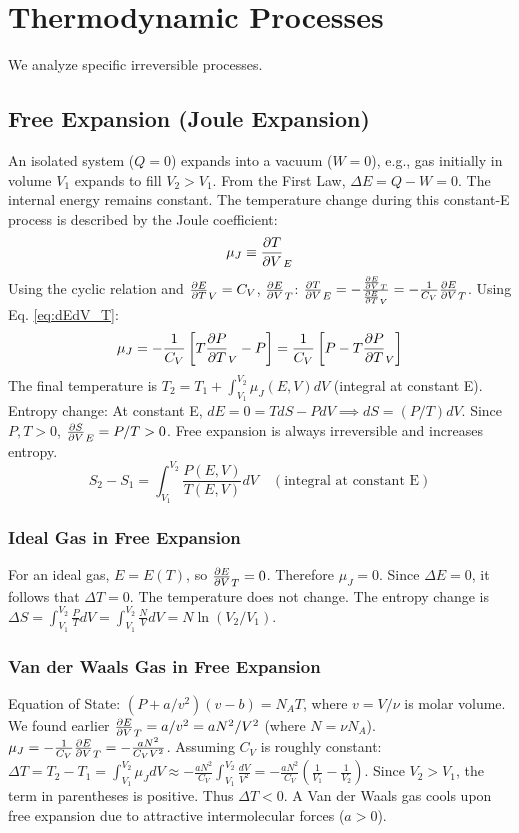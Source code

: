 \documentclass[10pt, letterpaper]{article}
\begin{document}
\section{Thermodynamic Processes}
We analyze specific irreversible processes.

\subsection{Free Expansion (Joule Expansion)}
An isolated system ($Q=0$) expands into a vacuum ($W=0$), e.g., gas initially in volume $V_1$ expands to fill $V_2 > V_1$.
From the First Law, $\Delta E = Q - W = 0$. The internal energy remains constant.
The temperature change during this constant-E process is described by the Joule coefficient:
\begin{equation*}
    \mu_J \equiv \pdv{T}{V}_{E}
\end{equation*}
Using the cyclic relation and $\pdv{E}{T}_V = C_V$, $\pdv{E}{V}_T$:
$\pdv{T}{V}_{E} = - \frac{\pdv{E}{V}_{T}}{\pdv{E}{T}_{V}} = -\frac{1}{C_V} \pdv{E}{V}_{T}$. Using Eq. \eqref{eq:dEdV_T}:
\begin{equation}
    \mu_J = -\frac{1}{C_V} \left[ T \pdv{P}{T}_{V} - P \right] = \frac{1}{C_V} \left[ P - T \pdv{P}{T}_{V} \right]
\end{equation}
The final temperature is $T_2 = T_1 + \int_{V_1}^{V_2} \mu_J(E, V) dV$ (integral at constant E).
Entropy change: At constant E, $dE=0=TdS-PdV \implies dS = (P/T) dV$.
Since $P, T > 0$, $\pdv{S}{V}_{E} = P/T > 0$. Free expansion is always irreversible and increases entropy.
\begin{equation}
    S_2 - S_1 = \int_{V_1}^{V_2} \frac{P(E, V)}{T(E, V)} dV \quad (\text{integral at constant E})
\end{equation}

\subsubsection*{Ideal Gas in Free Expansion}
For an ideal gas, $E=E(T)$, so $\pdv{E}{V}_T = 0$. Therefore $\mu_J = 0$.
Since $\Delta E = 0$, it follows that $\Delta T = 0$. The temperature does not change.
The entropy change is $\Delta S = \int_{V_1}^{V_2} \frac{P}{T} dV = \int_{V_1}^{V_2} \frac{N}{V} dV = N \ln(V_2/V_1)$.

\subsubsection*{Van der Waals Gas in Free Expansion}
Equation of State: $(P + a/v^2)(v-b) = N_A T$, where $v=V/\nu$ is molar volume.
We found earlier $\pdv{E}{V}_{T} = a/v^2 = a N^2 / V^2$ (where $N=\nu N_A$).
$\mu_J = -\frac{1}{C_V} \pdv{E}{V}_{T} = -\frac{a N^2}{C_V V^2}$.
Assuming $C_V$ is roughly constant:
$\Delta T = T_2 - T_1 = \int_{V_1}^{V_2} \mu_J dV \approx -\frac{a N^2}{C_V} \int_{V_1}^{V_2} \frac{dV}{V^2} = -\frac{a N^2}{C_V} \left( \frac{1}{V_1} - \frac{1}{V_2} \right)$.
Since $V_2 > V_1$, the term in parentheses is positive. Thus $\Delta T < 0$. A Van der Waals gas cools upon free expansion due to attractive intermolecular forces ($a>0$).
\end{document}
